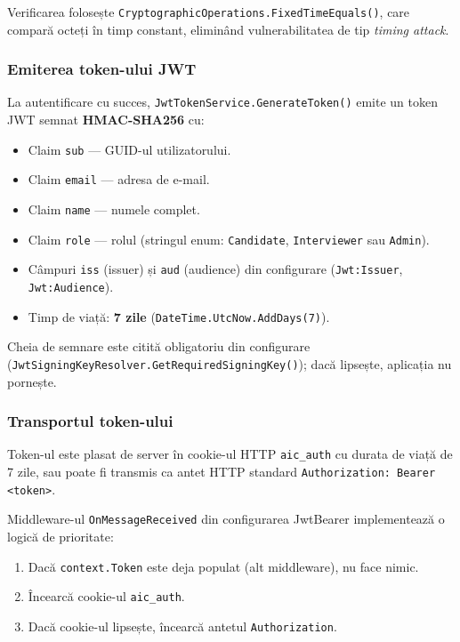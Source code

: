 Verificarea folosește \texttt{CryptographicOperations.FixedTimeEquals()},
care compară octeți în timp constant, eliminând vulnerabilitatea de tip
\emph{timing attack}.

\subsubsection{Emiterea token-ului JWT}

La autentificare cu succes, \texttt{JwtTokenService.GenerateToken()} emite
un token JWT semnat \textbf{HMAC-SHA256} cu:

\begin{itemize}
  \item Claim \texttt{sub} — GUID-ul utilizatorului.
  \item Claim \texttt{email} — adresa de e-mail.
  \item Claim \texttt{name} — numele complet.
  \item Claim \texttt{role} — rolul (stringul enum: \texttt{Candidate},
        \texttt{Interviewer} sau \texttt{Admin}).
  \item Câmpuri \texttt{iss} (issuer) și \texttt{aud} (audience) din
        configurare (\texttt{Jwt:Issuer}, \texttt{Jwt:Audience}).
  \item Timp de viață: \textbf{7 zile} (\texttt{DateTime.UtcNow.AddDays(7)}).
\end{itemize}

Cheia de semnare este citită obligatoriu din configurare
(\texttt{JwtSigningKeyResolver.GetRequiredSigningKey()}); dacă lipsește,
aplicația nu pornește.

\subsubsection{Transportul token-ului}

Token-ul este plasat de server în cookie-ul HTTP \texttt{aic\_auth} cu
durata de viață de 7 zile, sau poate fi transmis ca antet HTTP standard
\texttt{Authorization: Bearer <token>}.

Middleware-ul \texttt{OnMessageReceived} din configurarea JwtBearer
implementează o logică de prioritate:

\begin{enumerate}
  \item Dacă \texttt{context.Token} este deja populat (alt middleware), nu
        face nimic.
  \item Încearcă cookie-ul \texttt{aic\_auth}.
  \item Dacă cookie-ul lipsește, încearcă antetul \texttt{Authorization}.
\end{enumerate}

